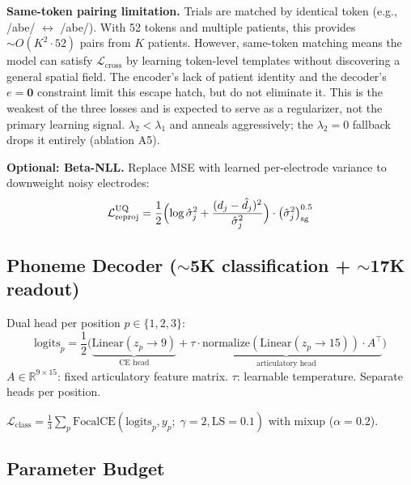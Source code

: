 \documentclass[11pt,letterpaper]{article}
\newcommand{\R}{\mathbb{R}}
\begin{document}
\textbf{Same-token pairing limitation.} Trials are matched by identical token (e.g., /abe/ $\leftrightarrow$ /abe/). With 52 tokens and multiple patients, this provides ${\sim}O(K^2 \cdot 52)$ pairs from $K$ patients. However, same-token matching means the model can satisfy $\mathcal{L}_{\text{cross}}$ by learning token-level templates without discovering a general spatial field. The encoder's lack of patient identity and the decoder's $e{=}\mathbf{0}$ constraint limit this escape hatch, but do not eliminate it. This is the weakest of the three losses and is expected to serve as a regularizer, not the primary learning signal. $\lambda_2 < \lambda_1$ and anneals aggressively; the $\lambda_2{=}0$ fallback drops it entirely (ablation A5).

\textbf{Optional: Beta-NLL.} Replace MSE with learned per-electrode variance to downweight noisy electrodes:
\begin{equation}
\mathcal{L}_{\text{reproj}}^{\text{UQ}} = \frac{1}{2}\Bigl(\log \hat{\sigma}_j^2 + \frac{(d_j - \hat{d}_j)^2}{\hat{\sigma}_j^2}\Bigr) \cdot \bigl(\hat{\sigma}_j^2\bigr)^{0.5}_{\text{sg}}
\end{equation}


\subsection{Phoneme Decoder (${\sim}$5K classification + ${\sim}$17K readout)}

Dual head per position $p \in \{1,2,3\}$:
\begin{equation}
\text{logits}_p = \frac{1}{2}\bigl(\underbrace{\text{Linear}(z_p \to 9)}_{\text{CE head}} + \underbrace{\tau \cdot \text{normalize}(\text{Linear}(z_p \to 15)) \cdot A^\top}_{\text{articulatory head}}\bigr)
\end{equation}
$A \in \R^{9 \times 15}$: fixed articulatory feature matrix. $\tau$: learnable temperature. Separate heads per position.

$\mathcal{L}_{\text{class}} = \frac{1}{3}\sum_{p} \text{FocalCE}(\text{logits}_p, y_p;\; \gamma{=}2, \text{LS}{=}0.1)$ with mixup ($\alpha{=}0.2$).


\subsection{Parameter Budget}
\end{document}
